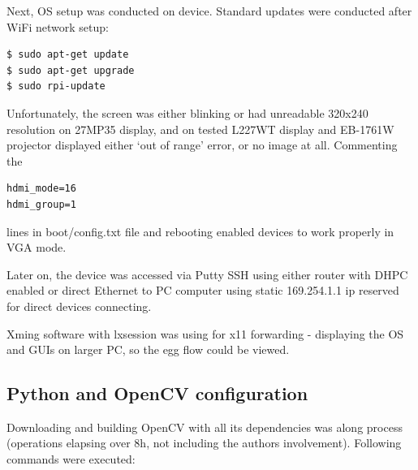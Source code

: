 \documentclass[12pt,twoside,a4paper]{article}
\begin{document}
Next, OS setup was conducted on device.
Standard updates were conducted after WiFi network setup:
\begin{lstlisting}
$ sudo apt-get update
$ sudo apt-get upgrade
$ sudo rpi-update
\end{lstlisting}

Unfortunately, the screen was either blinking or had unreadable 320x240 resolution on 27MP35 display, and on tested L227WT display and EB-1761W projector displayed either ‘out of range’ error, or no image at all.
Commenting the 
\begin{lstlisting}
hdmi_mode=16
hdmi_group=1 
\end{lstlisting}
lines in boot/config.txt file and rebooting enabled devices to work properly in VGA mode.

Later on, the device was accessed via Putty SSH using either router with DHPC enabled or direct Ethernet to PC computer using static 169.254.1.1 ip reserved for direct devices connecting.

Xming software with lxsession was using for x11 forwarding - displaying the OS and GUIs on larger PC, so the egg flow could be viewed.

\subsection{Python and OpenCV configuration}

Downloading and building OpenCV with all its dependencies was along process (operations elapsing over 8h, not including the authors involvement).
Following commands were executed:
\end{document}
